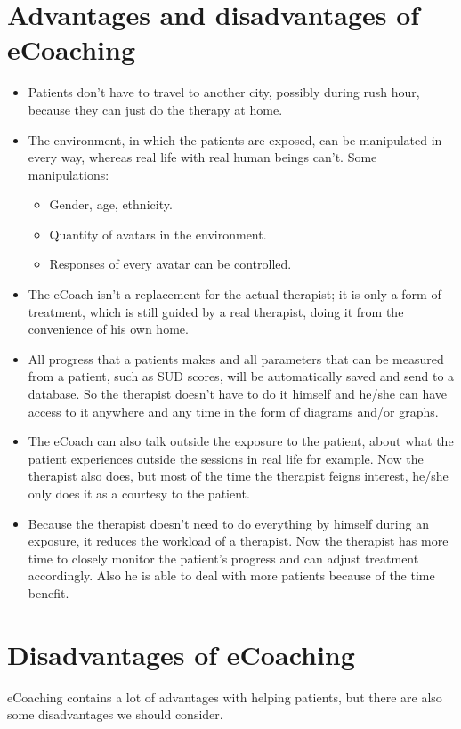 \documentclass[twoside]{article}
\begin{document}
\begin{multicols}{2}
\section{Advantages and disadvantages of eCoaching}
\begin{itemize}
\item Patients don't have to travel to another city, possibly during rush hour, because they can just do the therapy at home.
\item The environment, in which the patients are exposed, can be manipulated in every way, whereas real life with real human beings can't. 
Some manipulations:
	\begin{itemize}
	\item Gender, age, ethnicity.
	\item Quantity of avatars in the environment.
	\item Responses of every avatar can be controlled.
	\end{itemize}
\item The eCoach isn't a replacement for the actual therapist; it is only a form of treatment, which is still guided by a real therapist, doing it from the convenience of his own home.
\item All progress that a patients makes and all parameters that can be measured from a patient, such as SUD scores, will be automatically saved and send to a database. So the therapist doesn't have to do it himself and he/she can have access to it anywhere and any time in the form of diagrams and/or graphs.
\item The eCoach can also talk outside the exposure to the patient, about what the patient experiences outside the sessions in real life for example. Now the therapist also does, but most of the time the therapist feigns interest, he/she only does it as a courtesy to the patient.
\item Because the therapist doesn't need to do everything by himself during an exposure, it reduces the workload of a therapist. Now the therapist has more time to closely monitor the patient's progress and can adjust treatment accordingly.  Also he is able to deal with more patients because of the time benefit.\cite{ter2011design}
\end{itemize}



\section{Disadvantages of eCoaching}
eCoaching contains a lot of advantages with helping patients, but there are also some disadvantages we should consider. 


\end{multicols}
\end{document}
